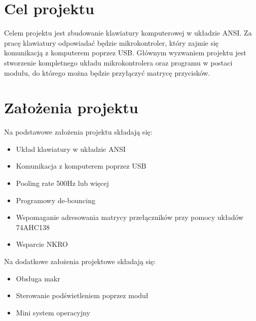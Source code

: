 \documentclass{article}
\begin{document}
\pagestyle{fancy}
    \section{Cel projektu}
    Celem projektu jest zbudowanie klawiatury komputerowej w układzie
    ANSI. Za pracę klawiatury odpowiadać będzie mikrokontroler, który zajmie się 
    komunikacją z komputerem poprzez USB.
    Głównym wyzwaniem projektu jest stworzenie kompletnego układu mikrokontrolera oraz programu
    w postaci modułu, do którego można będzie przyłączyć matrycę przycisków.

    \section{Założenia projektu}
    Na podstawowe założenia projektu składają się:
        \begin{itemize}
            \item Układ klawiatury w układzie ANSI
            \item Komunikacja z komputerem poprzez USB
            \item Pooling rate 500Hz lub więcej
            \item Programowy de-bouncing
            \item Wspomaganie adresowania matrycy przełączników przy pomocy układów 74AHC138
            \item Wsparcie NKRO
        \end{itemize}
    Na dodatkowe założenia projektowe składają się:
        \begin{itemize}
            \item Obsługa makr
            \item Sterowanie podświetleniem poprzez moduł
            \item Mini system operacyjny
        \end{itemize}
\end{document}
